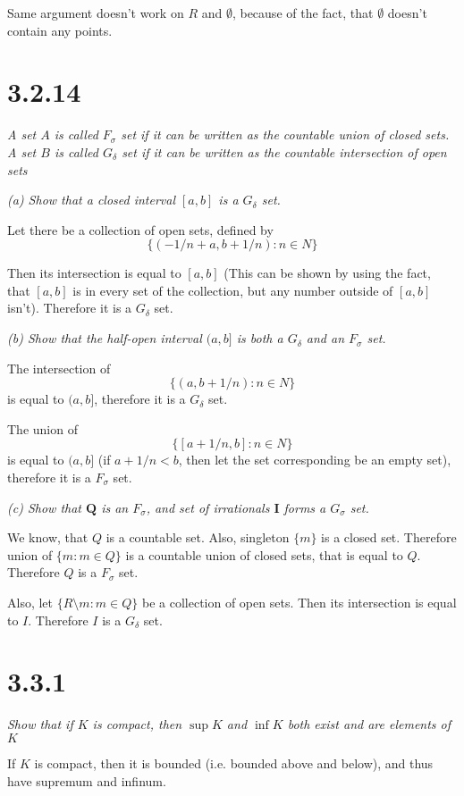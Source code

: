 \documentclass[11pt,oneside,titlepage]{book}
\begin{document}
Same argument doesn't work on $R$ and $\emptyset$, because of the fact,
that $\emptyset$ doesn't contain any points.

\section*{3.2.14}
\textit{A set $A$ is called $F_\sigma$ set if it can be written as the
  countable union of closed sets. A set $B$ is called $G_\delta$ set if it
  can be written as the countable intersection of open sets}

\textit{(a) Show that a closed interval $[a,b]$ is a $G_\delta$ set.}

Let there be a collection of open sets, defined by
$$\{(-1/n + a, b + 1/n): n \in N\}$$

Then its intersection is equal to $[a,b]$ (This can be shown by using the fact, that
$[a,b]$ is in every set of the  collection, but any number outside of $[a,b]$
isn't). Therefore it is a $G_\delta$ set.

\textit{(b) Show that the half-open interval $(a,b]$ is both a $G_\delta$ and
  an $F_\sigma$ set.}

The intersection of
$$\{(a, b + 1/n): n \in N\}$$
is equal to $(a, b]$, therefore it is a $G_\delta$ set.

The union of
$$\{[a + 1/n, b]: n \in N\}$$
is equal to $(a, b]$ (if  $a + 1/n < b$, then let the set corresponding be an
empty set), therefore it is a $F_\sigma$ set.

\textit{(c) Show that $\textbf{Q}$ is an $F_\sigma$, and set of irrationals
  $\textbf{I}$ forms a $G_\sigma$ set.}

We know, that $Q$ is a countable set. Also, singleton $\{m\}$ is a closed set.
Therefore union of 
$\{m: m \in Q\}$
is a countable union of closed sets, that is equal to $Q$. Therefore $Q$ is a
$F_\sigma$ set.

Also, let
$\{R \setminus m: m \in Q\}$
be a collection of open sets. Then its intersection is equal to $I$.
Therefore $I$ is a $G_\delta$ set.

\section*{3.3.1}
\textit{Show that if $K$ is compact, then $\sup K$ and $\inf K$ both exist
  and are elements of $K$}

If $K$ is compact, then it is bounded (i.e. bounded above and below), and
thus have supremum and infinum.
\end{document}
